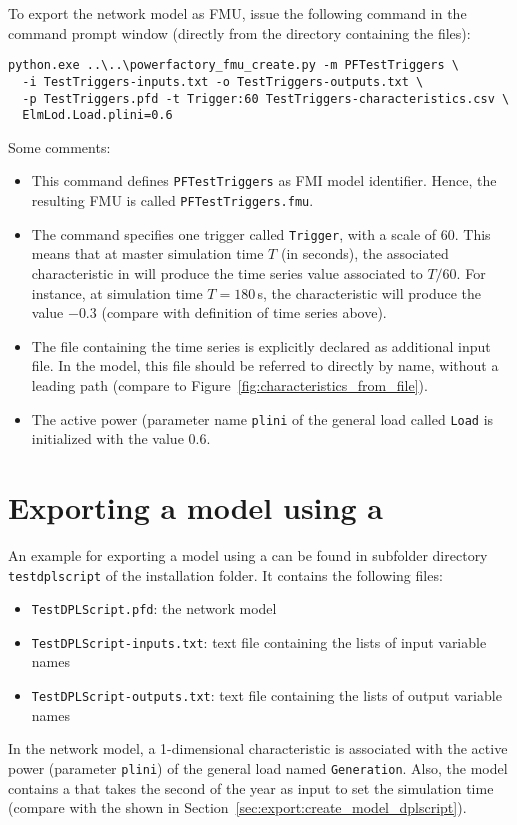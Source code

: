 To export the network model as FMU, issue the following command in the command prompt window (directly from the directory containing the files):
\begin{verbatim}
python.exe ..\..\powerfactory_fmu_create.py -m PFTestTriggers \
  -i TestTriggers-inputs.txt -o TestTriggers-outputs.txt \
  -p TestTriggers.pfd -t Trigger:60 TestTriggers-characteristics.csv \
  ElmLod.Load.plini=0.6
\end{verbatim}
Some comments:
\begin{itemize}
  \item This command defines \texttt{PFTestTriggers} as FMI model identifier.
  Hence, the resulting FMU is called \texttt{PFTestTriggers.fmu}.
  \item The command specifies one trigger called \texttt{Trigger}, with a scale of 60.
  This means that at master simulation time $T$ (in seconds), the associated characteristic in \pf will produce the time series value associated to $T/60$.
  For instance, at simulation time $T=180\,$s, the characteristic will produce the value $-0.3$ (compare with definition of time series above).
  \item The file containing the time series is explicitly declared as additional input file.
  In the \pf model, this file should be referred to directly by name, without a leading path (compare to Figure~\ref{fig:characteristics_from_file}).
  \item The active power (parameter name \texttt{plini} of the general load called \texttt{Load} is initialized with the value $0.6$.
\end{itemize}

\newpage

\section{Exporting a model using a \dplscript}
\label{sec:examples:dplscript}

An example for exporting a model using a \dplscript can be found in subfolder directory \texttt{testdplscript} of the installation folder.
It contains the following files:
\begin{itemize}
  \item \texttt{TestDPLScript.pfd}: the \pf network model
  \item \texttt{TestDPLScript-inputs.txt}: text file containing the lists of input variable names
  \item \texttt{TestDPLScript-outputs.txt}: text file containing the lists of output variable names
\end{itemize}
In the network model, a 1-dimensional characteristic is associated with the active power (parameter \texttt{plini}) of the general load named \texttt{Generation}.
Also, the \pf model contains a \dplscript that takes the second of the year as input to set the simulation time (compare with the \dplscript shown in Section~\ref{sec:export:create_model_dplscript}).


